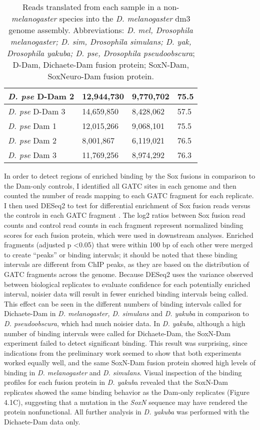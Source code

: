 \begin{table}[h]
\begin{tabular}{|l|l|l|l|}
\emph{D. pse} D-Dam 2    & 12,944,730   & 9,770,702        & 75.5          \\ \hline
\emph{D. pse} D-Dam 3    & 14,659,850   & 8,428,062        & 57.5          \\ \hline
\emph{D. pse} Dam 1      & 12,015,266   & 9,068,101        & 75.5          \\ \hline
\emph{D. pse} Dam 2      & 8,001,867    & 6,119,021        & 76.5          \\ \hline
\emph{D. pse} Dam 3      & 11,769,256   & 8,974,292        & 76.3          \\ \hline
\end{tabular}
\caption{Reads translated from each sample in a non-\emph{melanogaster} species into the \emph{D. melanogaster} dm3 genome assembly. Abbreviations: \emph{D. mel, Drosophila melanogaster; D. sim, Drosophila simulans; D. yak, Drosophila yakuba; D. pse, Drosophila pseudoobscura}; D-Dam, Dichaete-Dam fusion protein; SoxN-Dam, SoxNeuro-Dam fusion protein.}
\label{Table 4.2}
\end{table}

In order to detect regions of enriched binding by the Sox fusions in comparison to the Dam-only controls, I identified all GATC sites in each genome and then counted the number of reads mapping to each GATC fragment for each replicate. I then used DESeq2 to test for differential enrichment of Sox fusion reads versus the controls in each GATC fragment \citep{love_moderated_2014}. The log2 ratios between Sox fusion read counts and control read counts in each fragment represent normalized binding scores for each fusion protein, which were used in downstream analyses. Enriched fragments (adjusted p \textless 0.05) that were within 100 bp of each other were merged to create “peaks” or binding intervals; it should be noted that these binding intervals are different from ChIP peaks, as they are based on the distribution of GATC fragments across the genome. Because DESeq2 uses the variance observed between biological replicates to evaluate confidence for each potentially enriched interval, noisier data will result in fewer enriched binding intervals being called. This effect can be seen in the different numbers of binding intervals called for Dichaete-Dam in \emph{D. melanogaster, D. simulans} and \emph{D. yakuba} in comparison to \emph{D. pseudoobscura}, which had much noisier data. In \emph{D. yakuba}, although a high number of binding intervals were called for Dichaete-Dam, the SoxN-Dam experiment failed to detect significant binding. This result was surprising, since indications from the preliminary work seemed to show that both experiments worked equally well, and the same SoxN-Dam fusion protein showed high levels of binding in \emph{D. melanogaster} and \emph{D. simulans}. Visual inspection of the binding profiles for each fusion protein in \emph{D. yakub}a revealed that the SoxN-Dam replicates showed the same binding behavior as the Dam-only replicates (Figure 4.1C), suggesting that a mutation in the \emph{SoxN} sequence may have rendered the protein nonfunctional. All further analysis in \emph{D. yakuba} was performed with the Dichaete-Dam data only.\\

